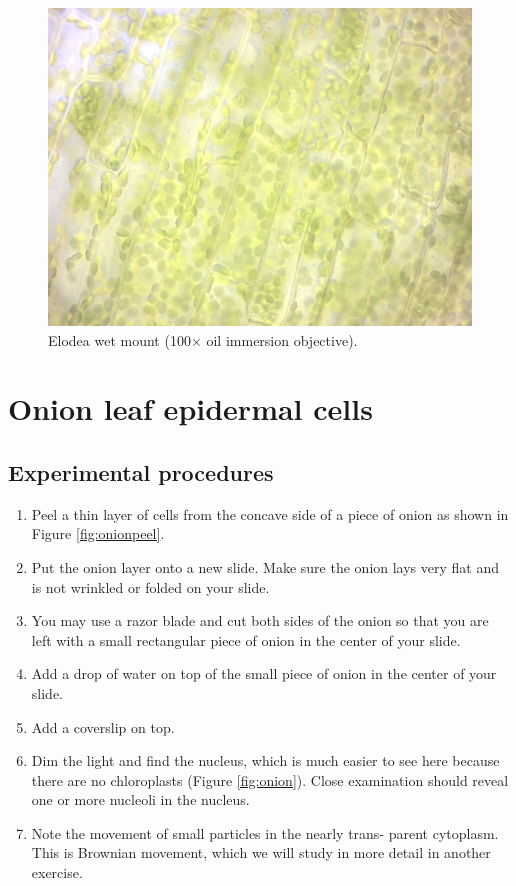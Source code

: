 \begin{figure}

{\centering \includegraphics[width=0.7\linewidth]{./figures/cell_struc/elodea} 

}

\caption{Elodea wet mount (100× oil immersion objective).}\label{fig:elodea}
\end{figure}

\section{Onion leaf epidermal cells}\label{onion-leaf-epidermal-cells}

\subsection{Experimental procedures}\label{experimental-procedures-8}

\begin{enumerate}
\def\labelenumi{\arabic{enumi}.}
\tightlist
\item
        Peel a thin layer of cells from the concave side of a piece of onion as shown in Figure \ref{fig:onionpeel}.
\item
  Put the onion layer onto a new slide. Make sure the onion lays very flat and is not wrinkled or folded on your slide.
\item
  You may use a razor blade and cut both sides of the onion so that you are left with a small rectangular piece of onion in the center of your slide.
\item
  Add a drop of water on top of the small piece of onion in the center of your slide.
\item
  Add a coverslip on top.
\item
  Dim the light and find the nucleus, which is much easier to see here
  because there are no chloroplasts (Figure \ref{fig:onion}). Close examination should reveal one
  or more nucleoli in the nucleus.
\item
  Note the movement of small particles in the nearly trans- parent
  cytoplasm. This is Brownian movement, which we will study in more
  detail in another exercise.
\end{enumerate}

